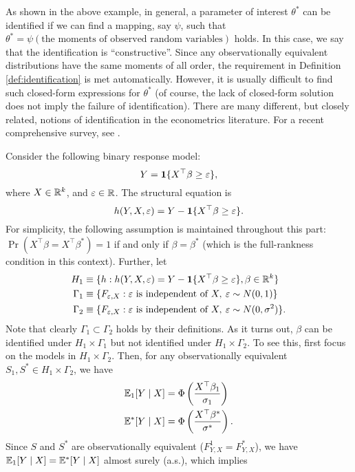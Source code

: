 \documentclass[11pt, A4paper, openany, uplatex]{book}
\begin{document}
As shown in the above example, in general, a parameter of interest $\theta^*$ can be identified if we can find a mapping, say $\psi$, such that $\theta^* = \psi(\text{the moments of observed random variables})$ holds.
In this case, we say that the identification is ``constructive''.
Since any observationally equivalent distributions have the same moments of all order, the requirement in Definition \ref{def:identification} is met automatically.
However, it is usually difficult to find such closed-form expressions for $\theta^*$ (of course, the lack of closed-form solution does not imply the failure of identification). 
There are many different, but closely related, notions of identification in the econometrics literature.
For a recent comprehensive survey, see \cite{lewbel2019identification}.

\begin{example}\upshape
Consider the following binary response model:
\[
	Y = \mathbf{1}\{ X^\top \beta \ge \varepsilon\},
\]
where $X \in \mathbb{R}^k$, and $\varepsilon \in \mathbb{R}$.
The structural equation is
\[
	h(Y, X, \varepsilon) = Y - \mathbf{1}\{ X^\top \beta \ge \varepsilon \}.
\]
For simplicity, the following assumption is maintained throughout this part: $\Pr(X^\top \beta = X^\top \beta^*) = 1$
if and only if  $\beta =  \beta^*$ (which is the full-rankness condition in this context).
Further, let
\begin{align*}
	H_1 &
	\equiv \{h : h(Y, X, \varepsilon) = Y - \mathbf{1}\{ X^\top \beta \ge \varepsilon\},  \beta \in \mathbb{R}^k \}\\
	\Gamma_1 
	& \equiv \{F_{\varepsilon,X} : \varepsilon \text{ is independent of } X, \: \varepsilon \sim N(0, 1)\} \\
	\Gamma_2
	& \equiv \{F_{\varepsilon,X} : \varepsilon \text{ is independent of } X, \: \varepsilon \sim N(0, \sigma^2)\}.
\end{align*}
Note that clearly $\Gamma_1 \subset \Gamma_2$ holds by their definitions.
As it turns out,  $\beta$ can be identified under $H_1 \times \Gamma_1$ but not identified under $H_1 \times \Gamma_2$.
To see this, first focus on the models in $H_1 \times \Gamma_2$.
Then, for any observationally equivalent $S_1, S^* \in H_1 \times \Gamma_2$, we have
\begin{align*}
	\mathbb{E}_1[Y \mid X] 
	& = \Phi \left(\frac{X^\top \beta_1}{\sigma_1} \right) \\
	\mathbb{E}^*[Y \mid X]
	& = \Phi \left(\frac{X^\top \beta^*}{\sigma^*} \right).
\end{align*}
Since $S$ and $S^*$ are observationally equivalent ($F^1_{Y,X} = F^*_{Y,X}$), we have $\mathbb{E}_1[Y \mid X] = \mathbb{E}^*[Y \mid X]$ almost surely (a.s.), which implies

\end{example}
\end{document}
